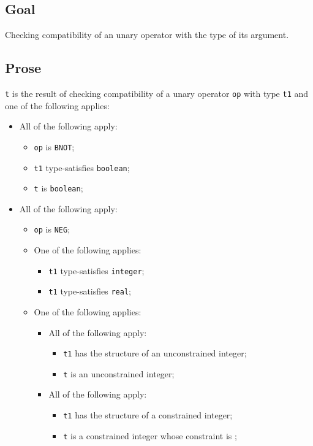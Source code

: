 \documentclass{book}
\begin{document}
\subsection{Goal}
  Checking compatibility of an unary operator with the type of its argument.

\subsection{Prose}
  \texttt{t} is the result of checking compatibility of a unary operator \texttt{op} with
  type \texttt{t1} and one of the following applies:
  \begin{itemize}
  \item All of the following apply:
    \begin{itemize}
    \item \texttt{op} is \texttt{BNOT};
    \item \texttt{t1} type-satisfies \texttt{boolean};
    \item \texttt{t} is \texttt{boolean};
    \end{itemize}

  \item All of the following apply:
    \begin{itemize}
    \item \texttt{op} is \texttt{NEG};
    \item One of the following applies:
      \begin{itemize}
      \item \texttt{t1} type-satisfies \texttt{integer}; 
      \item \texttt{t1} type-satisfies \texttt{real};
      \end{itemize}
     \item One of the following applies:
       \begin{itemize}
       \item All of the following apply:
         \begin{itemize}
         \item \texttt{t1} has the structure of an unconstrained integer;
         \item \texttt{t} is an unconstrained integer;
         \end{itemize}
       \item All of the following apply:
         \begin{itemize}
         \item \texttt{t1} has the structure of a constrained integer;
         \item \texttt{t} is a constrained integer whose constraint is ;
         \end{itemize}
       \end{itemize}
    \end{itemize}  


\end{itemize}
\end{document}
